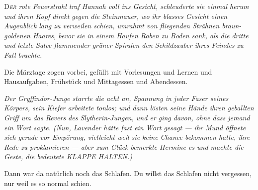 
\lettrine{D}{\emph{er}} \emph{rote Feuerstrahl traf Hannah voll ins Gesicht, schleuderte sie einmal herum und ihren Kopf direkt gegen die Steinmauer, wo ihr blasses Gesicht einen Augenblick lang zu verweilen schien, umrahmt von fliegenden Strähnen braun-goldenen Haares, bevor sie in einem Haufen Roben zu Boden sank, als die dritte und letzte Salve flammender grüner Spiralen den Schildzauber ihres Feindes zu Fall brachte.}

Die Märztage zogen vorbei, gefüllt mit Vorlesungen und Lernen und Hausaufgaben, Frühstück und Mittagessen und Abendessen.

\emph{Der Gryffindor-Junge starrte die acht an, Spannung in jeder Faser seines Körpers, sein Kiefer arbeitete tonlos; und dann lösten seine Hände ihren geballten Griff um das Revers des Slytherin-Jungen, und er ging davon, ohne dass jemand ein Wort sagte. (Nun, Lavender hätte fast ein Wort gesagt — ihr Mund öffnete sich gerade vor Empörung, vielleicht weil sie keine Chance bekommen hatte, ihre Rede zu proklamieren — aber zum Glück bemerkte Hermine es und machte die Geste, die bedeutete KLAPPE HALTEN.)}

Dann war da natürlich noch das Schlafen. Du willst das Schlafen nicht vergessen, nur weil es so normal schien.

